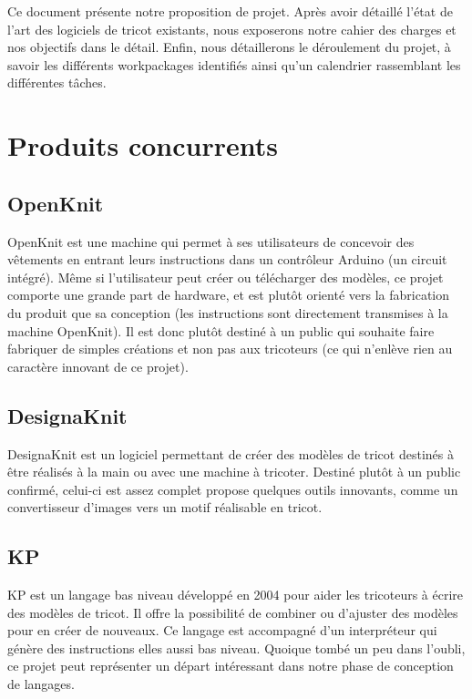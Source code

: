 \documentclass{article}
\begin{document}
Ce document présente notre proposition de projet. Après avoir détaillé l'état de l'art des logiciels de tricot existants, nous exposerons
notre cahier des charges et nos objectifs dans le détail. Enfin, nous détaillerons le déroulement du projet, à savoir les différents 
workpackages identifiés ainsi qu'un calendrier rassemblant les différentes tâches.


\section{Produits concurrents}



\subsection{OpenKnit}

OpenKnit est une machine qui permet à ses utilisateurs de concevoir des vêtements en entrant leurs instructions dans un contrôleur Arduino
(un circuit intégré). Même si l'utilisateur peut créer ou télécharger des modèles, ce projet comporte une grande part de hardware, et est
plutôt orienté vers la fabrication du produit que sa conception (les instructions sont directement transmises à la machine OpenKnit). Il
est donc plutôt destiné à un public qui souhaite faire fabriquer de simples créations et non pas aux tricoteurs (ce qui n'enlève rien au
caractère innovant de ce projet).

\subsection{DesignaKnit}

DesignaKnit est un logiciel permettant de créer des modèles de tricot destinés à être réalisés à la main ou avec une machine à tricoter.
Destiné plutôt à un public confirmé, celui-ci est assez complet propose quelques outils innovants, comme un convertisseur d'images vers un 
motif réalisable en tricot.

\subsection{KP}

KP est un langage bas niveau développé en 2004 pour aider les tricoteurs à écrire des modèles de tricot. Il offre la possibilité de 
combiner ou d'ajuster des modèles pour en créer de nouveaux. Ce langage est accompagné d'un interpréteur qui génère des instructions elles
aussi bas niveau. Quoique tombé un peu dans l'oubli, ce projet peut représenter un départ intéressant dans notre phase de conception de
langages.
\end{document}
